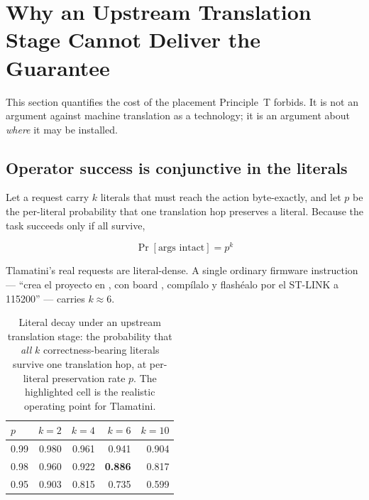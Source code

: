 \section{Why an Upstream Translation Stage Cannot Deliver the Guarantee}
\label{sec:upstream-translation}

This section quantifies the cost of the placement Principle~T forbids. It is not
an argument against machine translation as a technology; it is an argument about
\emph{where} it may be installed.

\subsection{Operator success is conjunctive in the literals}
\label{sec:conjunctive-literals}

Let a request carry $k$ literals that must reach the action byte-exactly, and let
$p$ be the per-literal probability that one translation hop preserves a literal.
Because the task succeeds only if all survive,

\begin{equation}
\Pr[\text{args intact}] = p^{k}
\label{eq:conjunctive-decay}
\end{equation}

Tlamatini's real requests are literal-dense. A single ordinary firmware
instruction --- \foreignlanguage{spanish}{``crea el proyecto en
,
con board , compílalo y flashéalo por el ST-LINK a
115200''} --- carries $k \approx 6$.

\begin{table}[htbp]
\centering
\small
\caption{Literal decay under an upstream translation stage: the probability that
\emph{all} $k$ correctness-bearing literals survive one translation hop, at
per-literal preservation rate $p$. The highlighted cell is the realistic
operating point for Tlamatini.}
\label{tab:literal-decay}
\begin{tabular}{@{}lrrrr@{}}
\toprule
$p$ & $k=2$ & $k=4$ & $k=6$ & $k=10$ \\
\midrule
0.99 & 0.980 & 0.961 & 0.941 & 0.904 \\
0.98 & 0.960 & 0.922 & \textbf{0.886} & 0.817 \\
0.95 & 0.903 & 0.815 & 0.735 & 0.599 \\
\bottomrule
\end{tabular}
\end{table}

